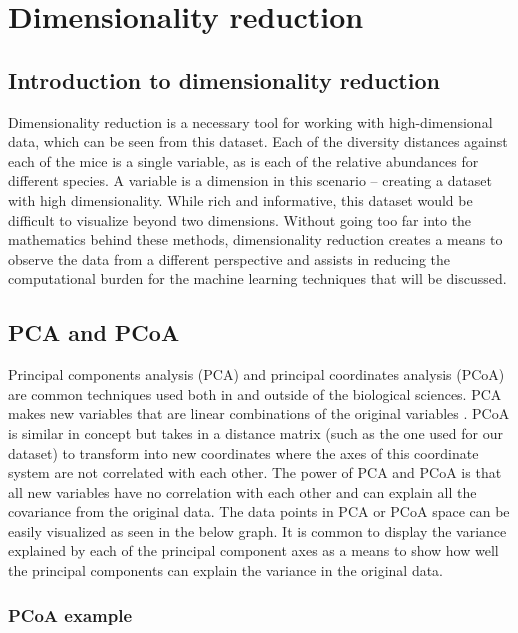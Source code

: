 \documentclass[12pt,openany]{book}
\begin{document}
\chapter{Dimensionality reduction}\label{dim_red}

\section{Introduction to dimensionality
reduction}\label{introduction-to-dimensionality-reduction}

Dimensionality reduction is a necessary tool for working with
high-dimensional data, which can be seen from this dataset. Each of the
diversity distances against each of the mice is a single variable, as is
each of the relative abundances for different species. A variable is a
dimension in this scenario -- creating a dataset with high
dimensionality. While rich and informative, this dataset would be
difficult to visualize beyond two dimensions. Without going too far into
the mathematics behind these methods, dimensionality reduction creates a
means to observe the data from a different perspective and assists in
reducing the computational burden for the machine learning techniques
that will be discussed.

\section{PCA and PCoA}\label{pca-and-pcoa}

Principal components analysis (PCA) and principal coordinates analysis
(PCoA) are common techniques used both in and outside of the biological
sciences. PCA makes new variables that are linear combinations of the
original variables \citep{shalizi}. PCoA is similar in concept but takes
in a distance matrix (such as the one used for our dataset) to transform
into new coordinates where the axes of this coordinate system are not
correlated with each other. The power of PCA and PCoA is that all new
variables have no correlation with each other and can explain all the
covariance from the original data. The data points in PCA or PCoA space
can be easily visualized as seen in the below graph. It is common to
display the variance explained by each of the principal component axes
as a means to show how well the principal components can explain the
variance in the original data.

\subsection{PCoA example}\label{pcoa-example}
\end{document}
